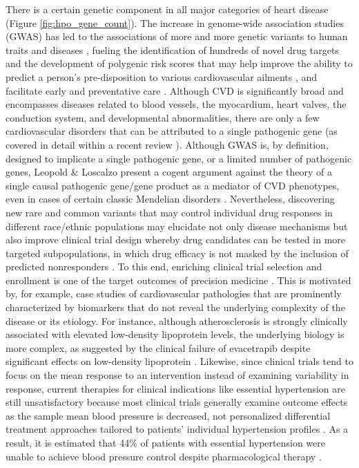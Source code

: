 \documentclass[letter]{bib}
\newcounter{example}[subsection]
\begin{document}
There is a certain genetic component in all major categories of heart disease (Figure \ref{fig:hpo_gene_count}). The increase in genome-wide association studies (GWAS) has led to the associations of more and more genetic variants to human traits and diseases \citep{Visscher:2017:10}, fueling the identification of hundreds of novel drug targets and the development of polygenic risk scores that may help improve the ability to predict a person's pre-disposition to various cardiovascular ailments \citep{Ganna:2013:Multilocus,Goldstein:2014:Simple,Krarup:2015:genetic,Tada:2016:Risk,Abraham:2016:Genomic}, and facilitate early and preventative care \citep{Assimes:2016:Genetic}.  Although CVD is significantly broad and encompasses diseases related to blood vessels, the myocardium, heart valves, the conduction system, and developmental abnormalities, there are only a few cardiovascular disorders that can be attributed to a single pathogenic gene (as covered in detail within a recent review \citep{Leopold:2018:Emerging}).  Although GWAS is, by definition, designed to implicate a single pathogenic gene, or a limited number of pathogenic genes, Leopold \& Loscalzo present a cogent argument against the theory of a single causal pathogenic gene/gene product as a mediator of CVD phenotypes, even in cases of certain classic Mendelian disorders \citep{Leopold:2018:Emerging}.  Nevertheless, discovering new rare and common variants that may control individual drug responses in different race/ethnic populations may elucidate not only disease mechanisms but also improve clinical trial design whereby drug candidates can be tested in more targeted subpopulations, in which drug efficacy is not masked by the inclusion of predicted nonresponders \citep{Lau:2018:Omics}.  To this end, enriching clinical trial selection and enrollment is one of the target outcomes of precision medicine \citep{Leopold:2018:Emerging}.  This is motivated by, for example, case studies of cardiovascular pathologies that are prominently characterized by biomarkers that do not reveal the underlying complexity of the disease or its etiology. For instance, although atherosclerosis is strongly clinically associated with elevated low-density lipoprotein levels, the underlying biology is more complex, as suggested by the clinical failure of evacetrapib despite significant effects on low-density lipoprotein \citep{Johnson:2017:Enabling}.  Likewise, since clinical trials tend to focus on the mean response to an intervention instead of examining variability in response, current therapies for clinical indications like essential hypertension are still unsatisfactory because most clinical trials generally examine outcome effects as the sample mean blood pressure is decreased, not personalized differential treatment approaches tailored to patients' individual hypertension profiles \citep{Johnson:2017:Enabling}.  As a result, it is estimated that 44\% of patients with essential hypertension were unable to achieve blood pressure control despite pharmacological therapy \citep{Johnson:2017:Enabling, Moran:2015:Cost}. 
\end{document}

